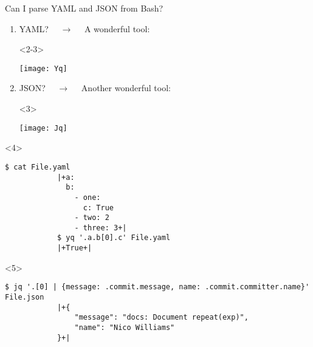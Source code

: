 \begin{frame}[fragile]{Can I parse YAML and JSON from Bash?}
    \vspace{-2mm}
    \begin{enumerate}
        \item<2-> YAML? $\quad\to\quad$ A wonderful tool: \\[1mm]
              \begin{onlyenv}<2-3>
                  \begin{center}
                      \texttt{[image: Yq]}
                  \end{center}
              \end{onlyenv}
        \item<3-> JSON? $\quad\to\quad$ Another wonderful tool: \\[1mm]
              \begin{onlyenv}<3>
                  \begin{center}
                      \texttt{[image: Jq]}
                  \end{center}
              \end{onlyenv}
    \end{enumerate}
    \vspace{2mm}
    \begin{onlyenv}<4>
        \begin{center}
        \end{center}
        \begin{lstlisting}[style=MyBash, numbers=none]
            $ cat File.yaml
            |+a:
              b:
                - one:
                  c: True
                - two: 2
                - three: 3+|
            $ yq '.a.b[0].c' File.yaml
            |+True+|
        \end{lstlisting}
    \end{onlyenv}
    \begin{onlyenv}<5>
        \begin{center}
        \end{center}
        \begin{lstlisting}[style=MyBash, numbers=none]
            $ jq '.[0] | {message: .commit.message, name: .commit.committer.name}' File.json
            |+{
                "message": "docs: Document repeat(exp)",
                "name": "Nico Williams"
            }+|
        \end{lstlisting}
    \end{onlyenv}
\end{frame}
